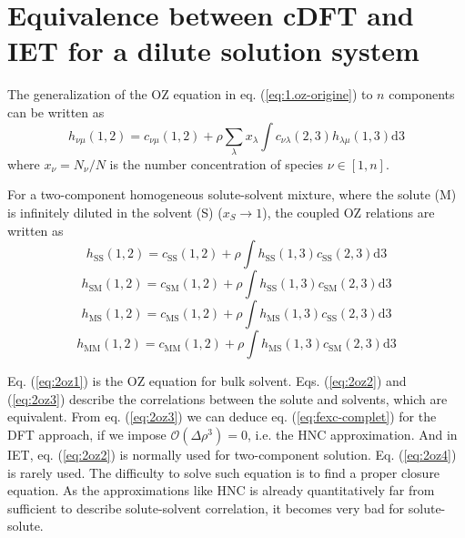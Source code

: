 \section{Equivalence between cDFT and IET for a dilute solution system\label{sec:Equivalence-iet-mdft}}

The generalization of the \acs{OZ} equation in eq. (\ref{eq:1.oz-origine})
to $n$ components can be written as
\begin{equation}
h_{\nu\mu}(1,2)=c_{\nu\mu}(1,2)+\rho\sum_{\lambda}x_{\lambda}\int c_{\nu\lambda}(2,3)h_{\lambda\mu}(1,3)\mathrm{d}3
\end{equation}
where $x_{\nu}=N_{\nu}/N$ is the number concentration of species
$\nu\in\left[1,n\right]$.

For a two-component homogeneous solute-solvent mixture, where the
solute (M) is infinitely diluted in the solvent (S) ($x_{S}\rightarrow1$),
the coupled \acs{OZ} relations are written as
\begin{equation}
h_{\mathrm{SS}}(1,2)=c_{\mathrm{SS}}(1,2)+\rho\int h_{\mathrm{SS}}(1,3)c_{\mathrm{SS}}(2,3)\mathrm{d}3\label{eq:2oz1}
\end{equation}
\begin{equation}
h_{\mathrm{SM}}(1,2)=c_{\mathrm{SM}}(1,2)+\rho\int h_{\mathrm{SS}}(1,3)c_{\mathrm{SM}}(2,3)\mathrm{d}3\label{eq:2oz2}
\end{equation}
\begin{equation}
h_{\mathrm{MS}}(1,2)=c_{\mathrm{MS}}(1,2)+\rho\int h_{\mathrm{MS}}(1,3)c_{\mathrm{SS}}(2,3)\mathrm{d}3\label{eq:2oz3}
\end{equation}
\begin{equation}
h_{\mathrm{MM}}(1,2)=c_{\mathrm{MM}}(1,2)+\rho\int h_{\mathrm{MS}}(1,3)c_{\mathrm{SM}}(2,3)\mathrm{d}3\label{eq:2oz4}
\end{equation}

Eq. (\ref{eq:2oz1}) is the \acs{OZ} equation for bulk solvent. Eqs.
(\ref{eq:2oz2}) and (\ref{eq:2oz3}) describe the correlations between
the solute and solvents, which are equivalent. From eq. (\ref{eq:2oz3})
we can deduce eq. (\ref{eq:fexc-complet}) for the \acs{DFT} approach,
if we impose $\mathcal{O}(\Delta\rho{}^{3})=0$, i.e. the \acs{HNC}
approximation. And in \acs{IET}, eq. (\ref{eq:2oz2}) is normally
used for two-component solution. Eq. (\ref{eq:2oz4}) is rarely used.
The difficulty to solve such equation is to find a proper closure
equation. As the approximations like \acs{HNC} is already quantitatively
far from sufficient to describe solute-solvent correlation, it becomes
very bad for solute-solute.
